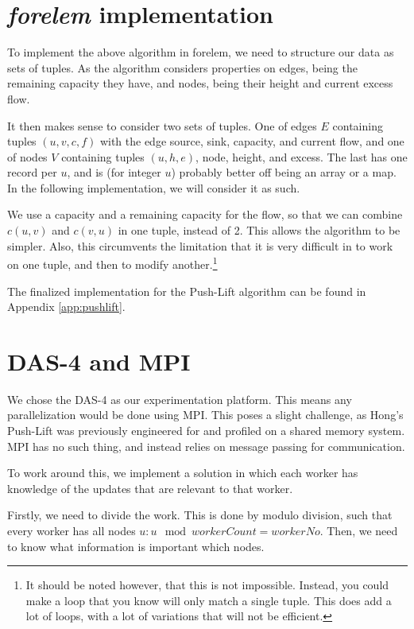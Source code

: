 \section{\textit{forelem} implementation}
\label{sec:forelem-pushlift}

To implement the above algorithm in forelem, we need to structure our data as sets of tuples. As the algorithm considers properties on edges, being the remaining capacity they have, and nodes, being their height and current excess flow.

It then makes sense to consider two sets of tuples. One of edges $E$ containing tuples $(u, v, c, f)$ with the edge source, sink, capacity, and current flow, and one of nodes $V$ containing tuples $(u, h, e)$, node, height, and excess. The last has one record per $u$, and is (for integer $u$) probably better off being an array or a map. In the following implementation, we will consider it as such.

We use a capacity and a remaining capacity for the flow, so that we can combine $c(u, v)$ and $c(v, u)$ in one tuple, instead of 2. This allows the algorithm to be simpler. Also, this circumvents the limitation that it is very difficult in \forelem to work on one tuple, and then to modify another.\footnote{It should be noted however, that this is not impossible. Instead, you could make a \forelem loop that you know will only match a single tuple. This does add a lot of loops, with a lot of variations that will not be efficient.}

The finalized implementation for the Push-Lift algorithm can be found in Appendix \ref{app:pushlift}.

\section{DAS-4 and MPI}
\label{sec:das4}

We chose the DAS-4 as our experimentation platform. This means any parallelization would be done using MPI. This poses a slight challenge, as Hong's Push-Lift was previously engineered for and profiled on a shared memory system. MPI has no such thing, and instead relies on message passing for communication.

To work around this, we implement a solution in which each worker has knowledge of the updates that are relevant to that worker.

Firstly, we need to divide the work. This is done by modulo division, such that every worker has all nodes $u : u \mod	 workerCount = workerNo$. Then, we need to know what information is important which nodes.

